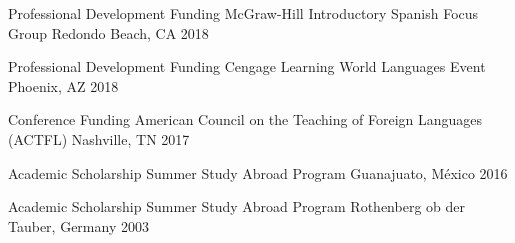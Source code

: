 \begin{cvhonors}
\cvhonor
{Professional Development Funding} %
{McGraw-Hill Introductory Spanish Focus Group} %
{Redondo Beach, CA} %
{2018} %


\cvhonor
{Professional Development Funding} %
{Cengage Learning World Languages Event} %
{Phoenix, AZ} %
{2018} %



\cvhonor
{Conference Funding} %
{American Council on the Teaching of Foreign Languages (ACTFL) } %
{Nashville, TN} %
{2017} %


\cvhonor
{Academic Scholarship} %
{Summer Study Abroad Program} %
{Guanajuato, México} %
{2016} %


\cvhonor
{Academic Scholarship} %
{Summer Study Abroad Program} %
{Rothenberg ob der Tauber, Germany} %
{2003} %


\end{cvhonors}
